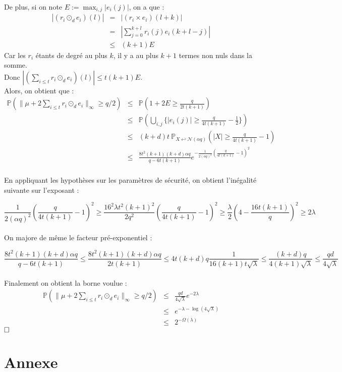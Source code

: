 \documentclass[11pt,a4paper]{article}
\begin{document}
De plus, si on note $E := \max_{i,j} |e_i(j)|$, on a que :  \\
\begin{eqnarray*}
|(r_i \odot_d e_i)(l)| &=& |(r_i\times e_i)(l+k)| \\
&=& |\sum_{j=0}^{k+l}r_i(j)e_i(k+l-j)| \\
&\leq& (k+1)E
\end{eqnarray*}
Car les $r_i$ étants de degré au plus $k$, il y a au plus $k+1$ termes non nuls dans la somme.\\

Donc $|(\sum_{i \leq t}r_i \odot_d e_i)(l)|\leq t(k+1)E$. \\

Alors, on obtient que : 
\begin{eqnarray*}
\mathbb{P}(\|\mu + 2\sum_{i \leq t}r_i \odot_d e_i  \|_\infty \geq q/2 ) &\leq& \mathbb{P}(1+2E \geq \frac{q}{2t(k+1)}) \\
&\leq& \mathbb{P}(\bigcup_{i,j} \{ |e_i(j)| \geq \frac{q}{4t(k+1)} - \frac{1}{2} \} ) \\
&\leq& (k+d)t \ \mathbb{P}_{X \hookleftarrow \mathcal{N}(\alpha q)}(|X| \geq \frac{q}{4t(k+1)} - 1) \\
&\leq& \frac{8t^2(k+1)(k+d)\alpha q}{q - 6t(k+1)} e^{-\frac{1}{2(\alpha q)^2}(\frac{q}{4t(k+1)}-1)^2} \\
\end{eqnarray*}

En appliquant les hypothèses sur les paramètres de sécurité, on obtient l'inégalité suivante sur l'exposant :

\[
\frac{1}{2(\alpha q)^2}(\frac{q}{4t(k+1)}-1)^2 \geq \frac{16^2\lambda t^2(k+1)^2}{2q^2}(\frac{q}{4t(k+1)}-1)^2 
\geq \frac{\lambda}{2}(4-\frac{16t(k+1)}{q})^2
\geq 2\lambda
\]
\\

On majore de même le facteur pré-exponentiel : 

\[
\frac{8t^2(k+1)(k+d)\alpha q}{q - 6t(k+1)} \leq \frac{8t^2(k+1)(k+d)\alpha q}{2t(k+1)}
\leq 4t(k+d)q\frac{1}{16(k+1)t\sqrt{\lambda}} 
\leq \frac{(k+d)q}{4(k+1)\sqrt{\lambda}}
\leq \frac{qd}{4\sqrt{\lambda}}
\]
\\

Finalement on obtient la borne voulue :
\begin{eqnarray*}
\mathbb{P}(\|\mu + 2\sum_{i \leq t}r_i \odot_d e_i  \|_\infty \geq q/2 ) &\leq&  \frac{qd}{4\sqrt{\lambda}}e^{-2\lambda} \\
&\leq& e^{-\lambda-\log(4\sqrt{\lambda})} \\
&\leq& 2^{-\Omega(\lambda)}
\end{eqnarray*}
$\hfill \square$


\section*{Annexe}
\printbibliography[heading=bibintoc, title={Références}]
\end{document}
